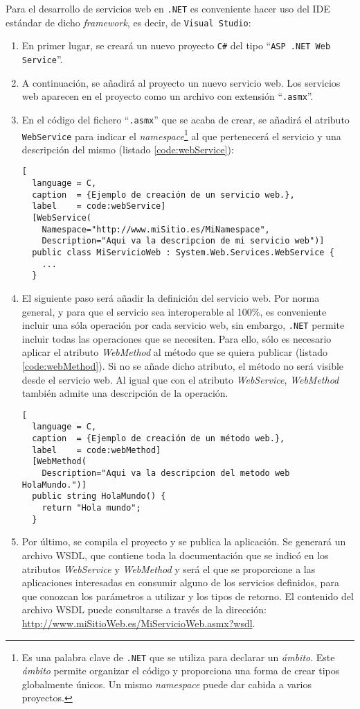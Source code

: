 Para el desarrollo de servicios web en \texttt{.NET} es conveniente hacer uso
del \acs{IDE} estándar de dicho \emph{framework}, es decir, de \texttt{Visual
Studio}:
\begin{enumerate}
\item En primer lugar, se creará un nuevo proyecto \texttt{C\#} del tipo
``\texttt{ASP .NET Web Service}''.
\item A continuación, se añadirá al proyecto un nuevo servicio web. Los
servicios web aparecen en el proyecto como un archivo con extensión
``\texttt{.asmx}''.
\item En el código del fichero ``\texttt{.asmx}'' que se acaba de crear, se
añadirá el atributo \texttt{WebService} para indicar el
\emph{namespace}\footnote{Es una palabra clave de \texttt{.NET} que se utiliza
para declarar un \emph{ámbito}. Este \emph{ámbito} permite organizar el código
y proporciona una forma de crear tipos globalmente únicos. Un mismo
\emph{namespace} puede dar cabida a varios proyectos.} al que pertenecerá el
servicio y una descripción del mismo (listado \ref{code:webService}):

\begin{lstlisting}[
  language = C,
  caption  = {Ejemplo de creación de un servicio web.},
  label    = code:webService]
  [WebService(
    Namespace="http://www.miSitio.es/MiNamespace",
    Description="Aqui va la descripcion de mi servicio web")]
  public class MiServicioWeb : System.Web.Services.WebService {
    ...
  }
\end{lstlisting}

\item El siguiente paso será añadir la definición del servicio web. Por norma
general, y para que el servicio sea interoperable al 100\%, es conveniente
incluir una sóla operación por cada servicio web, sin embargo, \texttt{.NET}
permite incluir todas las operaciones que se necesiten. Para ello, sólo es
necesario aplicar el atributo \emph{WebMethod} al método que se quiera publicar
(listado \ref{code:webMethod}). Si no se añade dicho atributo, el método no
será visible desde el servicio web. Al igual que con el atributo
\emph{WebService}, \emph{WebMethod} también admite una descripción de la
operación.

\begin{lstlisting}[
  language = C,
  caption  = {Ejemplo de creación de un método web.},
  label    = code:webMethod]
  [WebMethod(
    Description="Aqui va la descripcion del metodo web HolaMundo.")]
  public string HolaMundo() {
    return "Hola mundo";
  }
\end{lstlisting}

\item Por último, se compila el proyecto y se publica la aplicación. Se
generará un archivo \acs{WSDL}, que contiene toda la documentación que se
indicó en los atributos \emph{WebService} y \emph{WebMethod} y será el que se 
proporcione a las aplicaciones interesadas en consumir alguno de los servicios
definidos, para que conozcan los parámetros a utilizar y los tipos de retorno.
El contenido del archivo \acs{WSDL} puede consultarse a través de la dirección:
\url{http://www.miSitioWeb.es/MiServicioWeb.asmx?wsdl}.
\end{enumerate}

